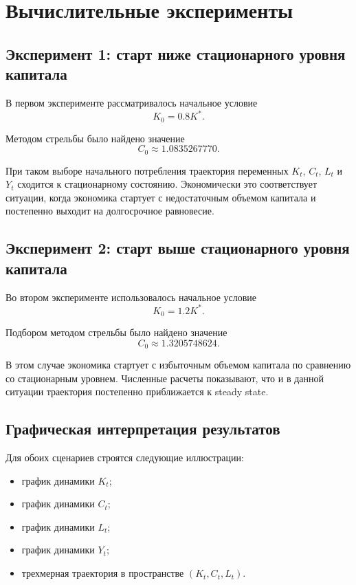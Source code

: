 \documentclass[14pt,a4paper]{extreport}
\begin{document}
    \section{Вычислительные эксперименты}

    \subsection{Эксперимент 1: старт ниже стационарного уровня капитала}

    В первом эксперименте рассматривалось начальное условие
    \begin{equation}
    K_0=0.8K^*.
    \end{equation}

    Методом стрельбы было найдено значение
    \begin{equation}
    C_0\approx 1.0835267770.
    \end{equation}

    При таком выборе начального потребления траектория переменных $K_t$, $C_t$, $L_t$ и $Y_t$ сходится к стационарному состоянию. Экономически это соответствует ситуации, когда экономика стартует с недостаточным объемом капитала и постепенно выходит на долгосрочное равновесие.

    \subsection{Эксперимент 2: старт выше стационарного уровня капитала}

    Во втором эксперименте использовалось начальное условие
    \begin{equation}
    K_0=1.2K^*.
    \end{equation}

    Подбором методом стрельбы было найдено значение
    \begin{equation}
    C_0\approx 1.3205748624.
    \end{equation}

    В этом случае экономика стартует с избыточным объемом капитала по сравнению со стационарным уровнем. Численные расчеты показывают, что и в данной ситуации траектория постепенно приближается к steady state.

    \subsection{Графическая интерпретация результатов}

    Для обоих сценариев строятся следующие иллюстрации:
    \begin{itemize}
        \item график динамики $K_t$;
        \item график динамики $C_t$;
        \item график динамики $L_t$;
        \item график динамики $Y_t$;
        \item трехмерная траектория в пространстве $(K_t,C_t,L_t)$.
    \end{itemize}
\end{document}
